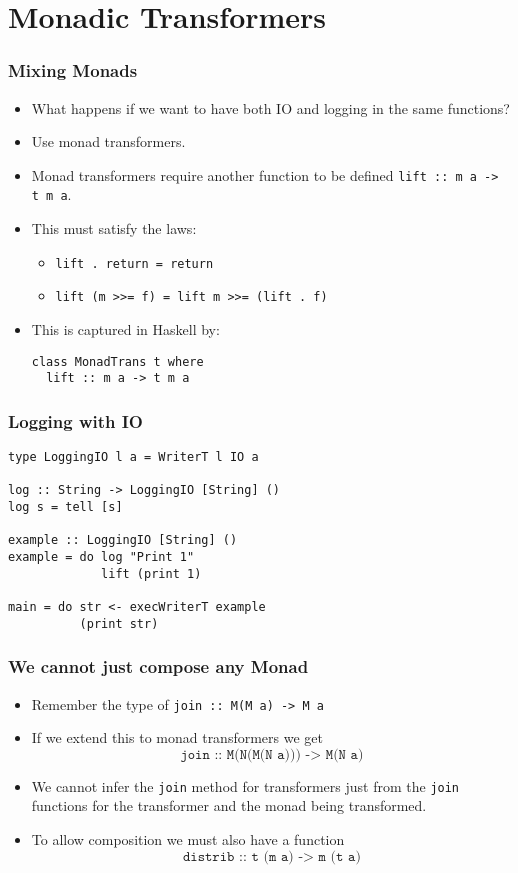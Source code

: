 \documentclass{beamer} %
\begin{document}
\section{Monadic Transformers}


\begin{frame}[fragile]\frametitle{Mixing Monads}
  \begin{itemize}
    \item What happens if we want to have both IO and logging in the same functions?

    \item Use monad transformers.

    \item Monad transformers require another function to be defined \mbox{\texttt{lift :: m a -> t m a}}.

    \item This must satisfy the laws:
      \begin{itemize}
        \item \texttt{lift . return = return}

        \item \texttt{lift (m >>= f) = lift m >>= (lift . f)}
      \end{itemize}

    \item This is captured in Haskell by:
\begin{verbatim}
class MonadTrans t where
  lift :: m a -> t m a
\end{verbatim}
  \end{itemize}
\end{frame}

\begin{frame}[fragile]\frametitle{Logging with IO}
\begin{verbatim}
type LoggingIO l a = WriterT l IO a

log :: String -> LoggingIO [String] ()
log s = tell [s]

example :: LoggingIO [String] ()
example = do log "Print 1"
             lift (print 1)

main = do str <- execWriterT example
          (print str)
\end{verbatim}
\end{frame}

\begin{frame}[fragile]\frametitle{We cannot just compose any Monad}
\begin{itemize}
  \item Remember the type of \texttt{join :: M(M a) -> M a}

  \item If we extend this to monad transformers we get \[\texttt{join :: M(N(M(N a))) -> M(N a)}\]

  \item We cannot infer the \texttt{join} method for transformers just from the \texttt{join} functions for
        the transformer and the monad being transformed.

  \item To allow composition we must also have a function \[\texttt{distrib :: t (m a) -> m (t a)}\]
\end{itemize}
\end{frame}
\end{document}
